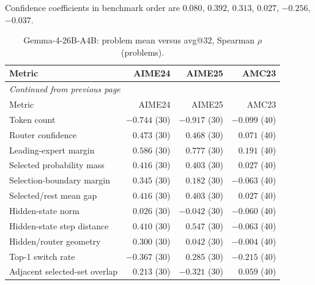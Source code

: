 Confidence coefficients in benchmark order are $0.080$, $0.392$, $0.313$, $0.027$, $-0.256$, $-0.037$.
\begingroup\scriptsize\setlength{\tabcolsep}{4pt}
\begin{longtable}{@{}lrrr@{}}
\caption{Gemma-4-26B-A4B: problem mean versus avg@32, Spearman $\rho$ (problems).}\label{tab:multi-repeated-gemma}\\
\toprule
Metric & AIME24 & AIME25 & AMC23 \\
\midrule\endfirsthead
\multicolumn{4}{l}{\textit{Continued from previous page}}\\
\toprule
Metric & AIME24 & AIME25 & AMC23 \\
\midrule\endhead
\bottomrule\endfoot
Token count & $-0.744$ (30) & $-0.917$ (30) & $-0.099$ (40) \\
Router confidence & $0.473$ (30) & $0.468$ (30) & $0.071$ (40) \\
Leading-expert margin & $0.586$ (30) & $0.777$ (30) & $0.191$ (40) \\
Selected probability mass & $0.416$ (30) & $0.403$ (30) & $0.027$ (40) \\
Selection-boundary margin & $0.345$ (30) & $0.182$ (30) & $-0.063$ (40) \\
Selected/rest mean gap & $0.416$ (30) & $0.403$ (30) & $0.027$ (40) \\
Hidden-state norm & $0.026$ (30) & $-0.042$ (30) & $-0.060$ (40) \\
Hidden-state step distance & $0.410$ (30) & $0.547$ (30) & $-0.063$ (40) \\
Hidden/router geometry & $0.300$ (30) & $0.042$ (30) & $-0.004$ (40) \\
Top-1 switch rate & $-0.367$ (30) & $0.285$ (30) & $-0.215$ (40) \\
Adjacent selected-set overlap & $0.213$ (30) & $-0.321$ (30) & $0.059$ (40) \\
\end{longtable}\endgroup

